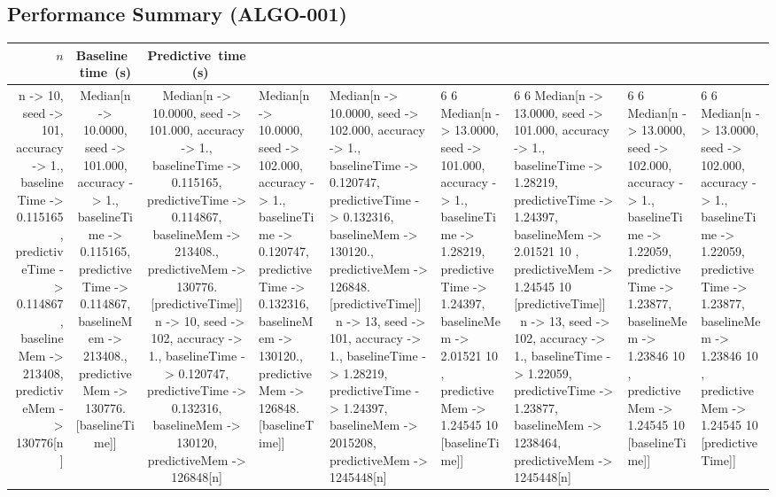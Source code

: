\subsection*{Performance Summary (ALGO-001)}
\begin{tabular}{rcc}
\toprule
$n$ & Baseline~time~(s) & Predictive~time~(s) \\ \midrule
{n -> 10, seed -> 101, accuracy -> 1., baselineTime -> 0.115165, predictiveTime -> 0.114867, baselineMem -> 213408, predictiveMem -> 130776}[n] & Median[{{n -> 10.0000, seed -> 101.000, accuracy -> 1., baselineTime -> 0.115165, predictiveTime -> 0.114867, baselineMem -> 213408., predictiveMem -> 130776.}[baselineTime]}] & Median[{{n -> 10.0000, seed -> 101.000, accuracy -> 1., baselineTime -> 0.115165, predictiveTime -> 0.114867, baselineMem -> 213408., predictiveMem -> 130776.}[predictiveTime]}] \ 
{n -> 10, seed -> 102, accuracy -> 1., baselineTime -> 0.120747, predictiveTime -> 0.132316, baselineMem -> 130120, predictiveMem -> 126848}[n] & Median[{{n -> 10.0000, seed -> 102.000, accuracy -> 1., baselineTime -> 0.120747, predictiveTime -> 0.132316, baselineMem -> 130120., predictiveMem -> 126848.}[baselineTime]}] & Median[{{n -> 10.0000, seed -> 102.000, accuracy -> 1., baselineTime -> 0.120747, predictiveTime -> 0.132316, baselineMem -> 130120., predictiveMem -> 126848.}[predictiveTime]}] \ 
{n -> 13, seed -> 101, accuracy -> 1., baselineTime -> 1.28219, predictiveTime -> 1.24397, baselineMem -> 2015208, predictiveMem -> 1245448}[n] &                                                                                                                                      6                             6
Median[{{n -> 13.0000, seed -> 101.000, accuracy -> 1., baselineTime -> 1.28219, predictiveTime -> 1.24397, baselineMem -> 2.01521 10 , predictiveMem -> 1.24545 10 }[baselineTime]}] &                                                                                                                                      6                             6
Median[{{n -> 13.0000, seed -> 101.000, accuracy -> 1., baselineTime -> 1.28219, predictiveTime -> 1.24397, baselineMem -> 2.01521 10 , predictiveMem -> 1.24545 10 }[predictiveTime]}] \ 
{n -> 13, seed -> 102, accuracy -> 1., baselineTime -> 1.22059, predictiveTime -> 1.23877, baselineMem -> 1238464, predictiveMem -> 1245448}[n] &                                                                                                                                      6                             6
Median[{{n -> 13.0000, seed -> 102.000, accuracy -> 1., baselineTime -> 1.22059, predictiveTime -> 1.23877, baselineMem -> 1.23846 10 , predictiveMem -> 1.24545 10 }[baselineTime]}] &                                                                                                                                      6                             6
Median[{{n -> 13.0000, seed -> 102.000, accuracy -> 1., baselineTime -> 1.22059, predictiveTime -> 1.23877, baselineMem -> 1.23846 10 , predictiveMem -> 1.24545 10 }[predictiveTime]}] \ 
\bottomrule
\end{tabular}
